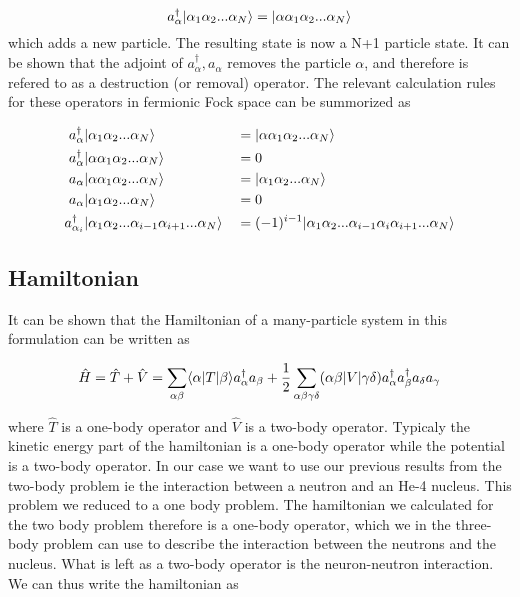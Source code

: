 \begin{equation}
a_{\alpha}^{\dagger} \ket{\alpha_1 \alpha_2 ... \alpha_N} =
\ket{\alpha \alpha_1 \alpha_2 ... \alpha_N}
\end{equation}
which adds a new particle. The resulting state is now a N+1 particle state. It can be shown that the adjoint of $ a_\alpha^{\dagger} , a_{\alpha}$ removes the particle $\alpha$, and therefore is refered to as a destruction (or removal) operator. The relevant calculation rules for these operators in fermionic Fock space can be summorized as

\begin{align}
 a_{\alpha}^{\dagger} & \ket{ \alpha_1 \alpha_2 ... \alpha_N} &&= \ket{\alpha \alpha_1 \alpha_2 ... \alpha_N} \label{eq:creation}
\\ 
 a_{\alpha}^{\dagger} & \ket{\alpha \alpha_1 \alpha_2 ... \alpha_N} &&= 0 \label{eq:creation zero}
\\ 
 a_{\alpha}  & \ket{\alpha \alpha_1 \alpha_2 ... \alpha_N} &&= \ket{\alpha_1 \alpha_2 ... \alpha_N} 
\\ 
 a_{\alpha} & \ket{\alpha_1 \alpha_2 ... \alpha_N} &&= 0\label{eq:annihilation zero}
\\ 
a_{\alpha_i}^{\dagger} & \ket{\alpha_1 \alpha_2 ... \alpha_{i-1} \alpha_{i+1}...\alpha_{N}} &&= (-1)^{i-1} \ket{\alpha_1 \alpha_2 ... \alpha_{i-1} \alpha_i \alpha_{i+1} ... \alpha_{N}} \label{eq:creation sign}
\\
\end{align}

\subsection{Hamiltonian}
It can be shown that the Hamiltonian of a many-particle system in this formulation can be written as

\begin{equation}
\hat{H} =
\hat{T} + \hat{V} =
\sum_{\alpha \beta} \bra{\alpha} T \ket{\beta} a_{\alpha}^{\dagger} a_{\beta} + \frac{1}{2}\sum_{\alpha \beta \gamma \delta} ( \alpha \beta| V | \gamma \delta ) a_{\alpha}^{\dagger} a_{\beta}^{\dagger} a_{\delta} a_{\gamma}
\end{equation}

where $\hat{T}$ is a one-body operator and $\hat{V}$ is a two-body operator. Typicaly the kinetic energy part of the hamiltonian is a one-body operator while the potential is a two-body operator. In our case we want to use our previous results from the two-body problem ie the interaction between a neutron and an He-4 nucleus. This problem we reduced to a one body problem. The hamiltonian we calculated for the two body problem therefore is a one-body operator, which we in the three-body problem can use to describe the interaction between the neutrons and the nucleus. What is left as a two-body operator is the neuron-neutron interaction. We can thus write the hamiltonian as

